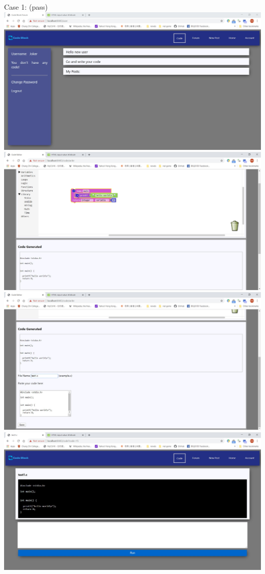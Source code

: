 Case 1: (pass)\\
\includegraphics[scale=0.45]{Doc/Pics/case-6-1-1-1}\\
\includegraphics[scale=0.45]{Doc/Pics/case-6-1-1-2}\\
\includegraphics[scale=0.45]{Doc/Pics/case-6-1-1-3}\\
\includegraphics[scale=0.45]{Doc/Pics/case-6-1-1-4}\\

